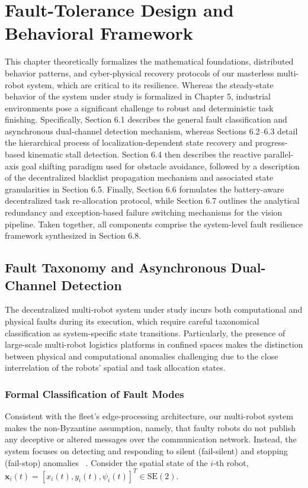 \chapter{Fault-Tolerance Design and Behavioral Framework\label{cha:chapter6}}

This chapter theoretically formalizes the mathematical foundations, distributed behavior patterns, and cyber-physical recovery protocols of our masterless multi-robot system, which are critical to its resilience. Whereas the steady-state behavior of the system under study is formalized in Chapter 5, industrial environments pose a significant challenge to robust and deterministic task finishing. Specifically, Section 6.1 describes the general fault classification and asynchronous dual-channel detection mechanism, whereas Sections 6.2--6.3 detail the hierarchical process of localization-dependent state recovery and progress-based kinematic stall detection. Section 6.4 then describes the reactive parallel-axis goal shifting paradigm used for obstacle avoidance, followed by a description of the decentralized blacklist propagation mechanism and associated state granularities in Section 6.5. Finally, Section 6.6 formulates the battery-aware decentralized task re-allocation protocol, while Section 6.7 outlines the analytical redundancy and exception-based failure switching mechanisms for the vision pipeline. Taken together, all components comprise the system-level fault resilience framework synthesized in Section 6.8.

\section{Fault Taxonomy and Asynchronous Dual-Channel Detection}

The decentralized multi-robot system under study incurs both computational and physical faults during its execution, which require careful taxonomical classification as system-specific state transitions. Particularly, the presence of large-scale multi-robot logistics platforms in confined spaces makes the distinction between physical and computational anomalies challenging due to the close interrelation of the robots' spatial and task allocation states.

\subsection{Formal Classification of Fault Modes}

Consistent with the fleet's edge-processing architecture, our multi-robot system makes the non-Byzantine assumption, namely, that faulty robots do not publish any deceptive or altered messages over the communication network. Instead, the system focuses on detecting and responding to silent (fail-silent) and stopping (fail-stop) anomalies ~\cite{okumura2023fault}. Consider the spatial state of the $i$-th robot, $\mathbf{x}_i(t) = [x_i(t), y_i(t), \psi_i(t)]^T \in \text{SE}(2)$.

